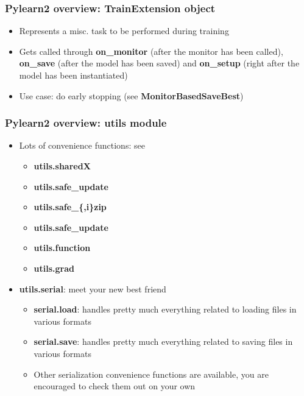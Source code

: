 \documentclass[mathserif, xcolor=dvipsnames]{beamer}
\begin{document}
\begin{frame}
    \frametitle{Pylearn2 overview: \textbf{TrainExtension} object}
    \Large
    \begin{itemize}\addtolength{\itemsep}{1.0\baselineskip}
        \item{Represents a misc. task to be performed during training}
        \item{Gets called through \textbf{on\_monitor} (after the monitor has
              been called), \textbf{on\_save} (after the model has been saved)
              and \textbf{on\_setup} (right after the model has been
              instantiated)}
        \item{Use case: do early stopping (see \textbf{MonitorBasedSaveBest})}
    \end{itemize}

\end{frame}

\begin{frame}
    \frametitle{Pylearn2 overview: \textbf{utils} module}
    \begin{itemize}\addtolength{\itemsep}{0.5\baselineskip}
        \item{
            Lots of convenience functions: see
            \begin{itemize} 
                \item{\textbf{utils.sharedX}}
                \item{\textbf{utils.safe\_update}}
                \item{\textbf{utils.safe\_\{,i\}zip}}
                \item{\textbf{utils.safe\_update}}
                \item{\textbf{utils.function}}
                \item{\textbf{utils.grad}}
            \end{itemize} 
        }
        \item{
            \textbf{utils.serial}: meet your new best friend
            \begin{itemize}
                \item{\textbf{serial.load}: handles pretty much everything
                      related to loading files in various formats}
                \item{\textbf{serial.save}: handles pretty much everything
                      related to saving files in various formats}
                \item{Other serialization convenience functions are available,
                      you are encouraged to check them out on your own}
            \end{itemize}
        }
    \end{itemize}

\end{frame}
\end{document}
